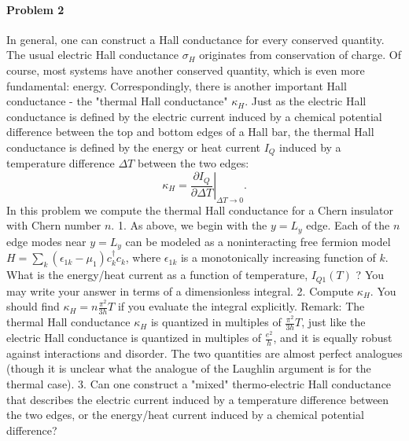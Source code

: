 \documentclass[hyperref, a4paper]{article}
\begin{document}
\begin{itemize}
\end{itemize}

\paragraph{Problem 2} In general, one can construct a Hall conductance for every conserved quantity. The usual electric Hall conductance $\sigma_H$ originates from conservation of charge. Of course, most systems have another conserved quantity, which is even more fundamental: energy. Correspondingly, there is another important Hall conductance - the "thermal Hall conductance" $\kappa_H$. Just as the electric Hall conductance is defined by the electric current induced by a chemical potential difference between the top and bottom edges of a Hall bar, the thermal Hall conductance is defined by the energy or heat current $I_Q$ induced by a temperature difference $\Delta T$ between the two edges:
$$
\kappa_H=\left.\frac{\partial I_Q}{\partial \Delta T}\right|_{\Delta T \rightarrow 0} .
$$
In this problem we compute the thermal Hall conductance for a Chern insulator with Chern number $n$.
1. As above, we begin with the $y=L_y$ edge. Each of the $n$ edge modes near $y=L_y$ can be modeled as a noninteracting free fermion model $H=\sum_k\left(\epsilon_{1 k}-\mu_1\right) c_k^{\dagger} c_k$, where $\epsilon_{1 k}$ is a monotonically increasing function of $k$. What is the energy/heat current as a function of temperature, $I_{Q 1}(T)$ ? You may write your answer in terms of a dimensionless integral.
2. Compute $\kappa_H$. You should find $\kappa_H=n \frac{\pi^2}{3 h} T$ if you evaluate the integral explicitly.
Remark: The thermal Hall conductance $\kappa_H$ is quantized in multiples of $\frac{\pi^2}{3 h} T$, just like the electric Hall conductance is quantized in multiples of $\frac{e^2}{h}$, and it is equally robust against interactions and disorder. The two quantities are almost perfect analogues (though it is unclear what the analogue of the Laughlin argument is for the thermal case).
3. Can one construct a "mixed" thermo-electric Hall conductance that describes the electric current induced by a temperature difference between the two edges, or the energy/heat current induced by a chemical potential difference?
\end{document}
